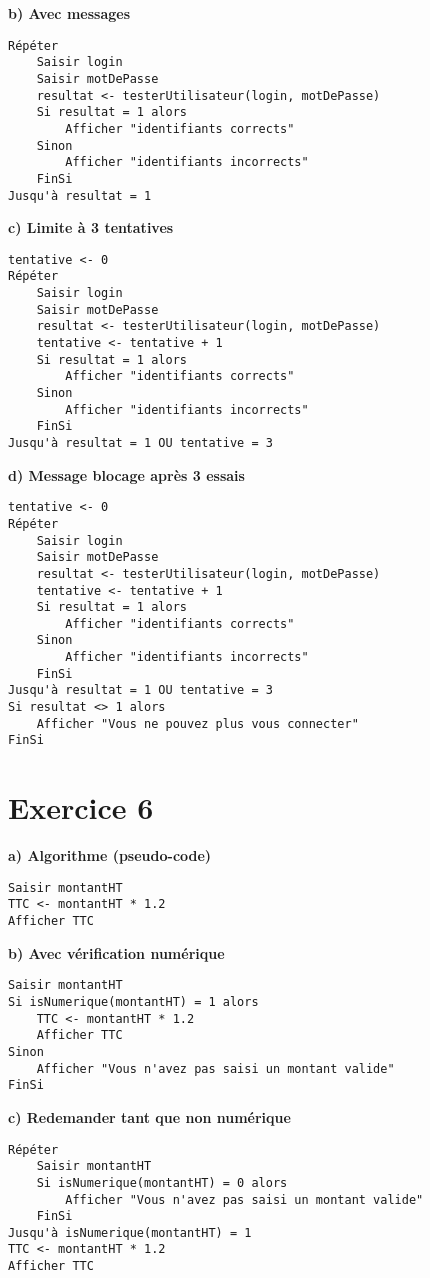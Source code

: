 \documentclass[12pt,a4paper]{article}
\begin{document}
\textbf{b) Avec messages}
\begin{verbatim}
Répéter
    Saisir login
    Saisir motDePasse
    resultat <- testerUtilisateur(login, motDePasse)
    Si resultat = 1 alors
        Afficher "identifiants corrects"
    Sinon
        Afficher "identifiants incorrects"
    FinSi
Jusqu'à resultat = 1
\end{verbatim}

\textbf{c) Limite à 3 tentatives}
\begin{verbatim}
tentative <- 0
Répéter
    Saisir login
    Saisir motDePasse
    resultat <- testerUtilisateur(login, motDePasse)
    tentative <- tentative + 1
    Si resultat = 1 alors
        Afficher "identifiants corrects"
    Sinon
        Afficher "identifiants incorrects"
    FinSi
Jusqu'à resultat = 1 OU tentative = 3
\end{verbatim}

\textbf{d) Message blocage après 3 essais}
\begin{verbatim}
tentative <- 0
Répéter
    Saisir login
    Saisir motDePasse
    resultat <- testerUtilisateur(login, motDePasse)
    tentative <- tentative + 1
    Si resultat = 1 alors
        Afficher "identifiants corrects"
    Sinon
        Afficher "identifiants incorrects"
    FinSi
Jusqu'à resultat = 1 OU tentative = 3
Si resultat <> 1 alors
    Afficher "Vous ne pouvez plus vous connecter"
FinSi
\end{verbatim}

\section*{Exercice 6}
\textbf{a) Algorithme (pseudo-code)}
\begin{verbatim}
Saisir montantHT
TTC <- montantHT * 1.2
Afficher TTC
\end{verbatim}

\textbf{b) Avec vérification numérique}
\begin{verbatim}
Saisir montantHT
Si isNumerique(montantHT) = 1 alors
    TTC <- montantHT * 1.2
    Afficher TTC
Sinon
    Afficher "Vous n'avez pas saisi un montant valide"
FinSi
\end{verbatim}

\textbf{c) Redemander tant que non numérique}
\begin{verbatim}
Répéter
    Saisir montantHT
    Si isNumerique(montantHT) = 0 alors
        Afficher "Vous n'avez pas saisi un montant valide"
    FinSi
Jusqu'à isNumerique(montantHT) = 1
TTC <- montantHT * 1.2
Afficher TTC
\end{verbatim}
\end{document}

